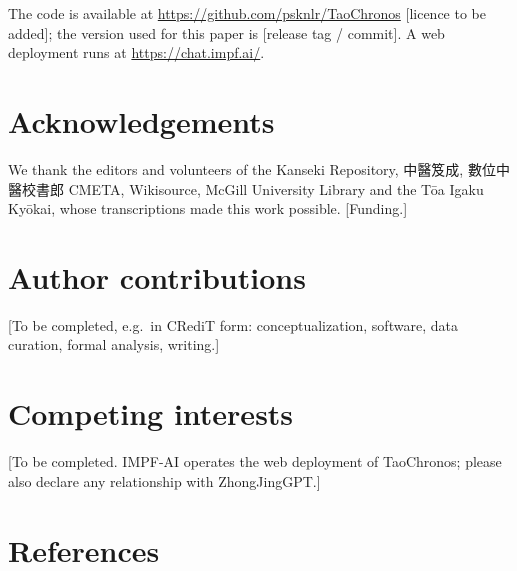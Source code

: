\documentclass[
]{article}
\begin{document}
The code is available at \url{https://github.com/psknlr/TaoChronos}
{[}licence to be added{]}; the version used for this paper is {[}release
tag / commit{]}. A web deployment runs at \url{https://chat.impf.ai/}.

\hypertarget{acknowledgements}{%
\section{Acknowledgements}\label{acknowledgements}}

We thank the editors and volunteers of the Kanseki Repository, 中醫笈成,
數位中醫校書郎 CMETA, Wikisource, McGill University Library and the Tōa
Igaku Kyōkai, whose transcriptions made this work possible.
{[}Funding.{]}

\hypertarget{author-contributions}{%
\section{Author contributions}\label{author-contributions}}

{[}To be completed, e.g.~in CRediT form: conceptualization, software,
data curation, formal analysis, writing.{]}

\hypertarget{competing-interests}{%
\section{Competing interests}\label{competing-interests}}

{[}To be completed. IMPF-AI operates the web deployment of TaoChronos;
please also declare any relationship with ZhongJingGPT.{]}

\hypertarget{references}{%
\section{References}\label{references}}
\end{document}

